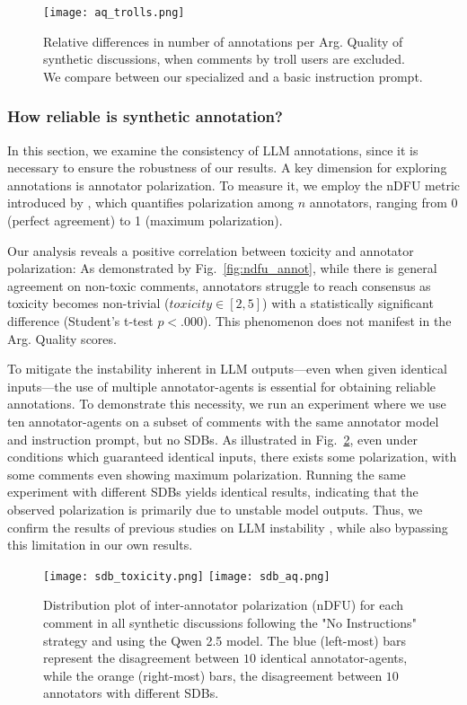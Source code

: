 \begin{figure}[t]
	\centering
	\texttt{[image: aq\_trolls.png]}
	\caption{Relative differences in number of annotations per Arg. Quality of synthetic discussions, when comments by troll users are excluded. We compare between our specialized and a basic instruction prompt.}
	\label{fig:aq_trolls}
\end{figure}


\subsubsection{How reliable is synthetic annotation?}

In this section, we examine the consistency of LLM annotations, since it is necessary to ensure the robustness of our results. A key dimension for exploring annotations is annotator polarization. To measure it, we employ the nDFU metric introduced by \citet{pavlopoulos-likas-2024-polarized}, which quantifies polarization among $n$ annotators, ranging from 0 (perfect agreement) to 1 (maximum polarization).

Our analysis reveals a positive correlation between toxicity and annotator polarization: As demonstrated by Fig.~\ref{fig:ndfu_annot}, while there is general agreement on non-toxic comments, annotators struggle to reach consensus as toxicity becomes non-trivial ($\textit{toxicity} \in [2,5]$) with a statistically significant difference (Student's t-test $p < .000$). This phenomenon does not manifest in the Arg. Quality scores. 

To mitigate the instability inherent in LLM outputs—even when given identical inputs—the use of multiple annotator-agents is essential for obtaining reliable annotations. To demonstrate this necessity, we run an experiment where we use ten annotator-agents on a subset of comments with the same annotator model and instruction prompt, but no SDBs. As illustrated in Fig.~\ref{fig:sdb_annot}, even under conditions which guaranteed identical inputs, there exists some polarization, with some comments even showing maximum polarization. Running the same experiment with different SDBs yields identical results, indicating that the observed polarization is primarily due to unstable model outputs. Thus, we confirm the results of previous studies on LLM instability \cite{rossi_2024, atil_2025}, while also bypassing this limitation in our own results.


\begin{figure}[t]
	\texttt{[image: sdb\_toxicity.png]} \hfill
	\texttt{[image: sdb\_aq.png]}
	\centering
	\caption{Distribution plot of inter-annotator polarization (nDFU) for each comment in all synthetic discussions following the "No Instructions" strategy and using the Qwen 2.5 model. The blue (left-most) bars represent the disagreement between $10$ identical annotator-agents, while the orange (right-most) bars, the disagreement between $10$ annotators with different SDBs.}
	\label{fig:sdb_annot}
\end{figure}

